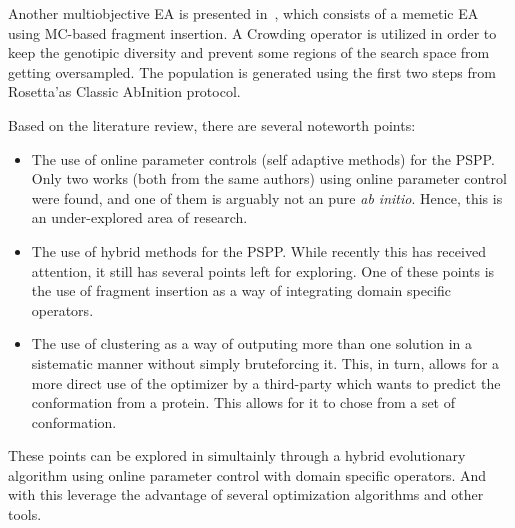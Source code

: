 Another multiobjective \ac{EA} is presented in~\cite{zaman2019balancing}, which
consists of a memetic EA using \ac{MC}-based fragment insertion. A Crowding operator
is utilized in order to keep the genotipic diversity and prevent some regions
of the search space from getting oversampled. The population is generated using
the first two steps from Rosetta'as Classic AbInition protocol.

Based on the literature review, there are several noteworth points:
\begin{itemize}
    \item The use of online parameter controls (self adaptive methods) for the PSPP.
    Only two works (both from the same authors) using online parameter control
    were found, and one of them is arguably not an pure \textit{ab initio}.
    Hence, this is an under-explored area of research.
    \item The use of hybrid methods for the PSPP. While recently this has received
    attention, it still has several points left for exploring. One of these points
    is the use of fragment insertion as a way of integrating domain specific operators.
    \item The use of clustering as a way of outputing more than one solution in a
    sistematic manner without simply bruteforcing it. This, in turn, allows for
    a more direct use of the optimizer by a third-party which wants to predict the
    conformation from a protein. This allows for it to chose from a set of conformation.
\end{itemize}

These points can be explored in simultainly through a hybrid evolutionary
algorithm using online parameter control with domain specific operators. And with
this leverage the advantage of several optimization algorithms and other tools.
